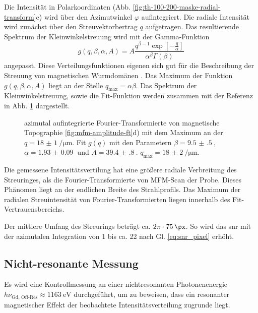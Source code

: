 \noindent
Die Intensität in Polarkoordinaten (Abb. \ref{fig:th-100-200-maske-radial-transform}c) wird über den Azimutwinkel $\varphi$ aufintegriert. Die radiale Intensität wird zunächst über den Streuvektorbertrag $q$  aufgetragen. Das resultierende Spektrum der Kleinwinkelstreuung wird mit der Gamma-Funktion
\begin{equation}
    g(q, \beta, \alpha, A) = A\frac{q^{\beta-1}\exp\left[-\frac{q}{\alpha}\right]}{\alpha^\beta\Gamma(\beta)}
\end{equation}
angepasst. Diese Verteilungsfunktionen eigenen sich gut für die Beschreibung der Streuung von magnetischen Wurmdomänen \cite{bagschik_employing_2016}. Das Maximum der Funktion $g(q, \beta, \alpha, A)$ liegt an der Stelle $q_\text{max} = \alpha\beta$. Das Spektrum der Kleinwinkelstreuung, sowie die Fit-Funktion werden zusammen mit der Referenz in Abb. \ref{fig:radius_fit} dargestellt.
\begin{figure}[H]
    \centering
    
    \caption{azimutal aufintegrierte Fourier-Transformierte von magnetische Topographie  \ref{fig:mfm-amplitude-ft}d) mit dem Maximum an der $q =\SI{18(1)}{\per\micro\meter}$. Fit $g(q)$ mit den Parametern $\beta = \SI{9.5(5)}{}$, $\alpha = \SI{1.93(9)}{}$ und $A = \SI{39.4(8)}{}$. $q_\text{max} = \SI{18(2)}{\per\micro\meter}$.}
    \label{fig:radius_fit}
\end{figure}
\noindent
Die gemessene Intensitätsvertilung hat eine größere radiale Verbreitung des Streuringes, als die Fourier-Transformierte von MFM-Scan der Probe. Dieses Phänomen liegt an der endlichen Breite des Strahlprofils. Das Maximum der radialen Streuintensität von Fourier-Transformierten liegen innerhalb des Fit-Vertrauensbereichs.

\noindent
Der mittlere Umfang des Streurings beträgt ca. $2\pi\cdot\SI{75}{\px}$. So wird das \gls{snr} mit der azimutalen Integration von 1 bis ca. 22 nach Gl. \ref{eq:snr_pixel} erhöht.

\subsection{Nicht-resonante Messung}
Es wird eine Kontrollmessung an einer nichtresonanten Photonenenergie $h\nu_{\text{Gd, Off-Res}} \approx \SI{1163}{\eV}$ durchgeführt, um zu beweisen, dass ein resonanter magnetischer Effekt der beobachtete Intensitätsverteilung zugrunde liegt.

